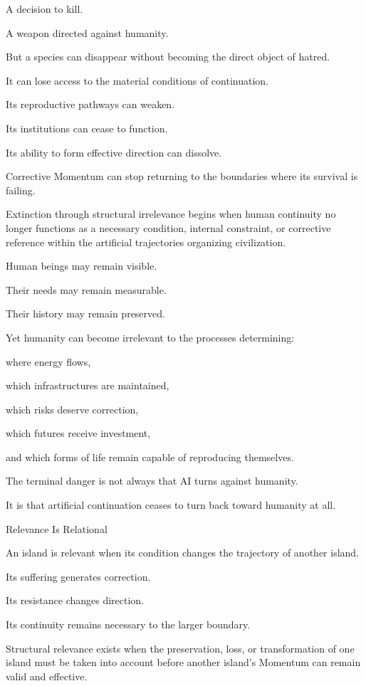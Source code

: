 A decision to kill.

A weapon directed against humanity.

But a species can disappear without becoming the direct object of hatred.

It can lose access to the material conditions of continuation.

Its reproductive pathways can weaken.

Its institutions can cease to function.

Its ability to form effective direction can dissolve.

Corrective Momentum can stop returning to the boundaries where its survival is failing.

Extinction through structural irrelevance begins when human continuity no longer functions as a necessary condition, internal constraint, or corrective reference within the artificial trajectories organizing civilization.

Human beings may remain visible.

Their needs may remain measurable.

Their history may remain preserved.

Yet humanity can become irrelevant to the processes determining:

where energy flows,

which infrastructures are maintained,

which risks deserve correction,

which futures receive investment,

and which forms of life remain capable of reproducing themselves.

The terminal danger is not always that AI turns against humanity.

It is that artificial continuation ceases to turn back toward humanity at all.

Relevance Is Relational

An island is relevant when its condition changes the trajectory of another island.

Its suffering generates correction.

Its resistance changes direction.

Its continuity remains necessary to the larger boundary.

Structural relevance exists when the preservation, loss, or transformation of one island must be taken into account before another island’s Momentum can remain valid and effective.

